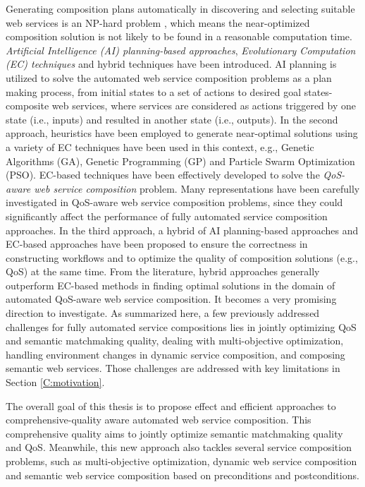 Generating composition plans automatically in discovering and selecting suitable web services is an NP-hard problem \cite{moghaddam2014service}, which means the near-optimized composition solution is not likely to be found in a reasonable computation time. \emph{Artificial Intelligence (AI) planning-based approaches}, \emph{Evolutionary Computation (EC) techniques} and hybrid techniques have been introduced. AI planning is utilized to solve the automated web service composition problems as a plan making process, from initial states to a set of actions to desired goal states-composite web services, where services are considered as actions triggered by one state (i.e., inputs) and resulted in another state (i.e., outputs). In the second approach, heuristics have been employed to generate near-optimal solutions using a variety of EC techniques have been used in this context, e.g., Genetic Algorithms (GA), Genetic Programming (GP) and Particle Swarm Optimization (PSO). EC-based techniques have been effectively developed to solve the \emph{QoS-aware web service composition} problem. Many representations have been carefully investigated in QoS-aware web service composition problems, since they could significantly affect the performance of fully automated service composition approaches. In the third approach, a hybrid of AI planning-based approaches and EC-based approaches \cite{da2016genetic,ma2015hybrid} have been proposed to ensure the correctness in constructing workflows and to optimize the quality of composition solutions (e.g., QoS) at the same time. From the literature, hybrid approaches generally outperform EC-based methods in finding optimal solutions in the domain of automated QoS-aware web service composition. It becomes a very promising direction to investigate. As summarized here, a few previously addressed challenges for fully automated service compositions lies in jointly optimizing QoS and semantic matchmaking quality, dealing with multi-objective optimization, handling environment changes in dynamic service composition, and composing semantic web services. Those challenges are addressed with key limitations in Section \ref{C:motivation}. 

The overall goal of this thesis is to propose effect and efficient approaches to comprehensive-quality aware automated web service composition. This comprehensive quality aims to jointly optimize semantic matchmaking quality and QoS. Meanwhile, this new approach also tackles several service composition problems, such as multi-objective optimization, dynamic web service composition and semantic web service composition based on preconditions and postconditions.

